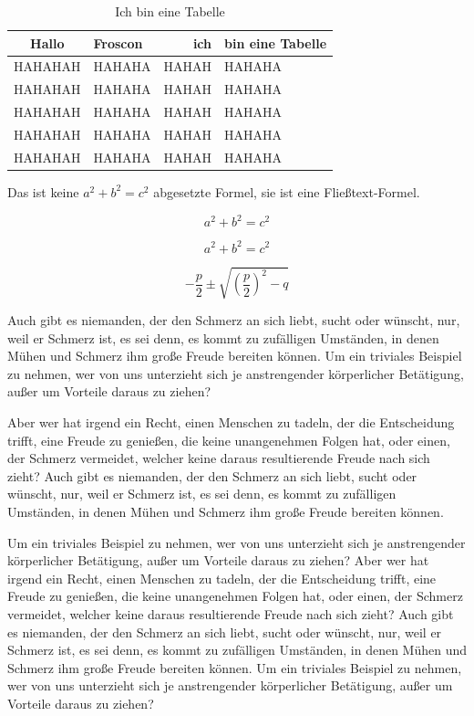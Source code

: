 \documentclass[12pt]{scrreprt}
\begin{document}
\begin{table}[h]
\caption{Ich bin eine Tabelle}\label{tab:hallo}
\begin{center}
\begin{tabular}{clrp{4cm}} \toprule
Hallo & Froscon & ich & bin eine Tabelle \\ \midrule
HAHAHAH & HAHAHA & HAHAH & HAHAHA \\ 
HAHAHAH & HAHAHA & HAHAH & HAHAHA \\ 
HAHAHAH & HAHAHA & HAHAH & HAHAHA \\ 
HAHAHAH & HAHAHA & HAHAH & HAHAHA \\ 
HAHAHAH & HAHAHA & HAHAH & HAHAHA \\ \bottomrule
\end{tabular}
\end{center}
\end{table}


Das ist keine $a^2+b^2=c^2$  abgesetzte Formel, sie ist eine Fließtext-Formel.

$$a^2+b^2=c^2$$ %


\begin{equation}
a^2+b^2=c^2
\end{equation}


\begin{equation}
-\frac{p}{2} 
\pm 
\sqrt{ 
  \left(\frac{p}{2}\right)^2 - q 
}
\end{equation}



Auch gibt es niemanden, der den Schmerz an sich liebt, sucht oder wünscht, nur, weil er Schmerz ist, es sei denn, es kommt zu zufälligen Umständen, in denen Mühen und Schmerz ihm große Freude bereiten können. Um ein triviales Beispiel zu nehmen, wer von uns unterzieht sich je anstrengender körperlicher Betätigung, außer um Vorteile daraus zu ziehen?

Aber wer hat irgend ein Recht, einen Menschen zu tadeln, der die Entscheidung trifft, eine Freude zu genießen, die keine unangenehmen Folgen hat, oder einen, der Schmerz vermeidet, welcher keine daraus resultierende Freude nach sich zieht? Auch gibt es niemanden, der den Schmerz an sich liebt, sucht oder wünscht, nur, weil er Schmerz ist, es sei denn, es kommt zu zufälligen Umständen, in denen Mühen und Schmerz ihm große Freude bereiten können.

Um ein triviales Beispiel zu nehmen, wer von uns unterzieht sich je anstrengender körperlicher Betätigung, außer um Vorteile daraus zu ziehen? Aber wer hat irgend ein Recht, einen Menschen zu tadeln, der die Entscheidung trifft, eine Freude zu genießen, die keine unangenehmen Folgen hat, oder einen, der Schmerz vermeidet, welcher keine daraus resultierende Freude nach sich zieht? Auch gibt es niemanden, der den Schmerz an sich liebt, sucht oder wünscht, nur, weil er Schmerz ist, es sei denn, es kommt zu zufälligen Umständen, in denen Mühen und Schmerz ihm große Freude bereiten können. Um ein triviales Beispiel zu nehmen, wer von uns unterzieht sich je anstrengender körperlicher Betätigung, außer um Vorteile daraus zu ziehen?
\end{document}
